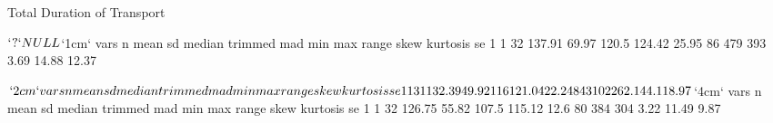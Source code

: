 \documentclass{article}
\begin{document}
Total Duration of Transport
\begin{Schunk}
\begin{Soutput}
$`?`
NULL

$`1cm`
  vars  n   mean    sd median trimmed   mad min max range skew kurtosis    se
1    1 32 137.91 69.97  120.5  124.42 25.95  86 479   393 3.69    14.88 12.37

$`2cm`
  vars  n   mean    sd median trimmed   mad min max range skew kurtosis   se
1    1 31 132.39 49.92    116  121.04 22.24  84 310   226 2.14     4.11 8.97

$`4cm`
  vars  n   mean    sd median trimmed  mad min max range skew kurtosis   se
1    1 32 126.75 55.82  107.5  115.12 12.6  80 384   304 3.22    11.49 9.87
\end{Soutput}
\end{Schunk}
\end{document}
